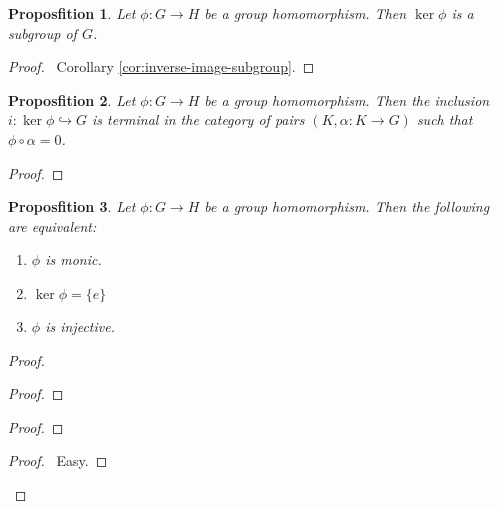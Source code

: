\documentclass{book}
\let\qed\relax
\newtheorem{prop}{Proposfition}[chapter]
\theoremstyle{definition}
\newcommand{\inv}[1]{\ensuremath{{#1}^{-1}}}
\begin{document}
\begin{prop}
Let $\phi : G \rightarrow H$ be a group homomorphism. Then $\ker \phi$ is a subgroup of $G$.
\end{prop}

\begin{proof}
\pf\ Corollary \ref{cor:inverse-image-subgroup}. \qed
\end{proof}

\begin{prop}
Let $\phi : G \rightarrow H$ be a group homomorphism. Then the inclusion $i : \ker \phi \hookrightarrow G$ is terminal in the category of pairs $(K,\alpha : K \rightarrow G)$ such that $\phi \circ \alpha = 0$.
\end{prop}

\begin{proof}
\pf
{}
\qed
\end{proof}

\begin{prop}
\label{prop:ker-zero}
Let $\phi : G \rightarrow H$ be a group homomorphism. Then the following are equivalent:
\begin{enumerate}
\item $\phi$ is monic.
\item $\ker \phi = \{e\}$
\item $\phi$ is injective.
\end{enumerate}
\end{prop}

\begin{proof}
\pf
{}
\begin{proof}
\end{proof}
\begin{proof}
	\step{d}{$\phi(x\inv{y}) = e$}
	\step{e}{$x \inv{y} \in \ker \phi$}
	\step{f}{$x \inv{y} = e$}
\end{proof}
\begin{proof}
	\pf\ Easy.
\end{proof}
\qed
\end{proof}
\end{document}
